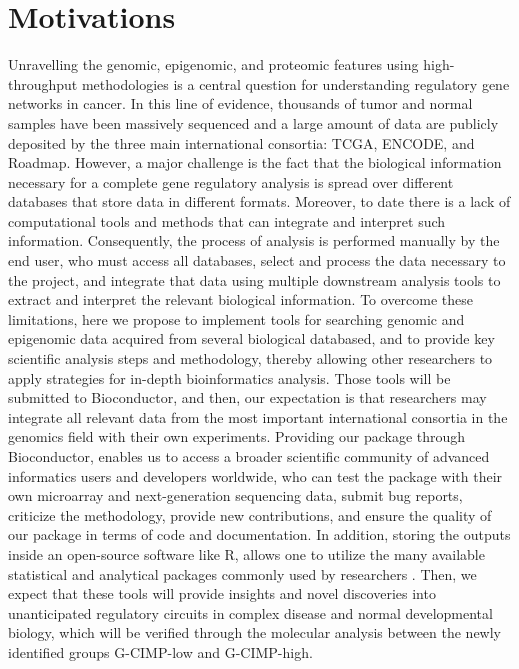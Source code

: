\section{Motivations}


Unravelling the genomic, epigenomic, and proteomic features using high-throughput methodologies is a central question for understanding regulatory gene networks in cancer. In this line of evidence, thousands of tumor and normal samples have been massively sequenced and a large amount of data are publicly deposited by the three main international consortia: TCGA, ENCODE, and Roadmap. However, a major challenge is the fact that the biological information necessary for a complete gene regulatory analysis is spread over different databases that store data in different formats. Moreover, to date there is a lack of  computational tools and methods that can integrate and interpret such information. Consequently, the process of analysis is performed manually by the end user, who must access all databases, select and process the data necessary to the project, and integrate that data using multiple downstream analysis tools to extract and interpret the relevant biological information.
To overcome these limitations, here we propose to implement tools for searching genomic and epigenomic data acquired from several biological databased, and to provide key scientific analysis steps and methodology, thereby allowing other researchers to apply  strategies for in-depth bioinformatics analysis. Those tools will be submitted to Bioconductor, and then, our expectation is that researchers may integrate all relevant data from the most important international consortia in the genomics field with their own experiments. Providing our package through Bioconductor, enables us to access a broader scientific community of advanced informatics users and developers worldwide, who can test the package with their own microarray and next-generation sequencing data, submit bug reports, criticize the methodology, provide new contributions, and ensure the quality of our package in terms of code and documentation.  In addition, storing the outputs inside an open-source software like R, allows one to utilize the many available statistical and analytical packages commonly used by researchers \cite{creditcode}. Then, we expect that these tools will provide insights and novel discoveries into unanticipated regulatory circuits in complex disease and normal developmental biology, which will be verified through the molecular analysis between the newly identified groups G-CIMP-low and G-CIMP-high.


